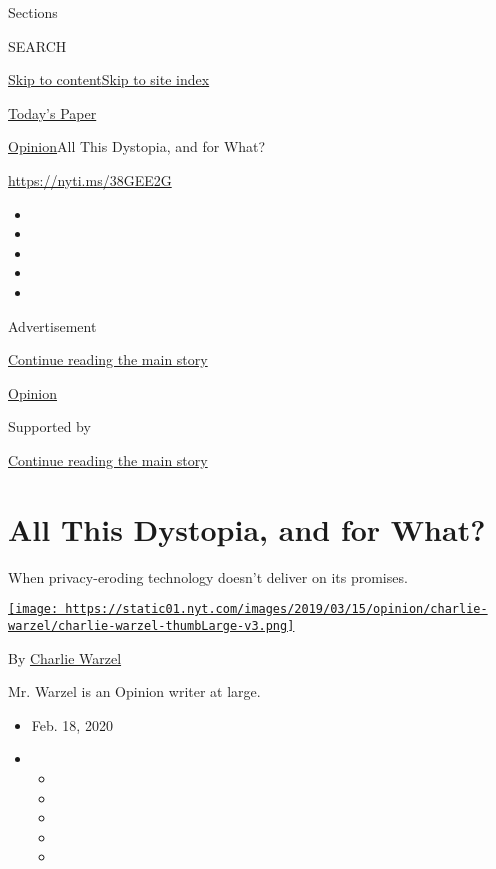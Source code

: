 Sections

SEARCH

\protect\hyperlink{site-content}{Skip to
content}\protect\hyperlink{site-index}{Skip to site index}

\href{https://myaccount.nytimes.com/auth/login?response_type=cookie\&client_id=vi}{}

\href{https://www.nytimes.com/section/todayspaper}{Today's Paper}

\href{/section/opinion}{Opinion}\textbar{}All This Dystopia, and for
What?

\url{https://nyti.ms/38GEE2G}

\begin{itemize}
\item
\item
\item
\item
\item
\end{itemize}

Advertisement

\protect\hyperlink{after-top}{Continue reading the main story}

\href{/section/opinion}{Opinion}

Supported by

\protect\hyperlink{after-sponsor}{Continue reading the main story}

\hypertarget{all-this-dystopia-and-for-what}{%
\section{All This Dystopia, and for
What?}\label{all-this-dystopia-and-for-what}}

When privacy-eroding technology doesn't deliver on its promises.

\href{https://www.nytimes.com/by/charlie-warzel}{\texttt{[image: https://static01.nyt.com/images/2019/03/15/opinion/charlie-warzel/charlie-warzel-thumbLarge-v3.png]}}

By \href{https://www.nytimes.com/by/charlie-warzel}{Charlie Warzel}

Mr. Warzel is an Opinion writer at large.

\begin{itemize}
\item
  Feb. 18, 2020
\item
  \begin{itemize}
  \item
  \item
  \item
  \item
  \item
  \end{itemize}
\end{itemize}

